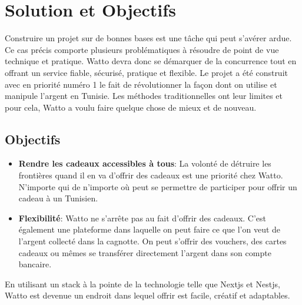 \documentclass[../main.tex]{subfiles}
\begin{document}
\section{Solution et Objectifs}
Construire un projet sur de bonnes bases est une tâche qui peut s'avérer ardue. Ce cas précis comporte plusieurs problématiques à résoudre de point de vue technique et pratique. 
Watto devra donc se démarquer de la concurrence tout en offrant un service fiable, sécurisé, pratique et flexible. 
Le projet a été construit avec en priorité numéro 1 le fait de révolutionner la façon dont on utilise et manipule l'argent en Tunisie. 
Les méthodes traditionnelles ont leur limites et pour cela, Watto a voulu faire quelque chose de mieux et de nouveau.

\subsection{Objectifs}
 \begin{itemize}
  \item \textbf{Rendre les cadeaux accessibles à tous}: La volonté de détruire les frontières quand il en va d'offrir des cadeaux est une priorité chez Watto. N'importe qui de n'importe où peut se permettre de participer pour offrir un cadeau à un Tunisien. 
  \item \textbf{Flexibilité}: Watto ne s'arrête pas au fait d'offrir des cadeaux. C'est également une plateforme dans laquelle on peut faire ce que l'on veut de l'argent collecté dans la cagnotte. On peut s'offrir des vouchers, des cartes cadeaux ou mêmes se transférer directement l'argent dans son compte bancaire. 
\end{itemize} 

En utilisant un stack à la pointe de la technologie telle que Nextjs et Nestjs, Watto est devenue un endroit dans lequel offrir est facile, créatif et adaptables. 
\end{document}
